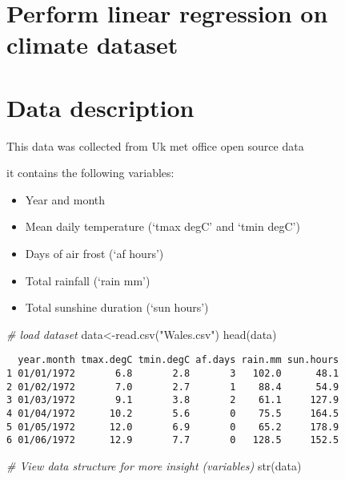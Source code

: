 \documentclass[
]{article}
\author{}
\date{\vspace{-2.5em}}
\newenvironment{Shaded}{\begin{snugshade}}{\end{snugshade}}
\newcommand{\CommentTok}[1]{\textcolor[rgb]{0.56,0.35,0.01}{\textit{#1}}}
\newcommand{\FunctionTok}[1]{\textcolor[rgb]{0.00,0.00,0.00}{#1}}
\newcommand{\NormalTok}[1]{#1}
\newcommand{\OtherTok}[1]{\textcolor[rgb]{0.56,0.35,0.01}{#1}}
\newcommand{\StringTok}[1]{\textcolor[rgb]{0.31,0.60,0.02}{#1}}
\begin{document}
\hypertarget{perform-linear-regression-on-climate-dataset}{%
\section{Perform linear regression on climate
dataset}\label{perform-linear-regression-on-climate-dataset}}

\hypertarget{data-description}{%
\section{Data description}\label{data-description}}

This data was collected from Uk met office open source data

it contains the following variables:

\begin{itemize}
\item
  Year and month
\item
  Mean daily temperature (`tmax degC' and `tmin degC')
\item
  Days of air frost (`af hours')
\item
  Total rainfall (`rain mm')
\item
  Total sunshine duration (`sun hours')
\end{itemize}

\begin{Shaded}
\begin{Highlighting}[]
\CommentTok{\# load dataset}
\NormalTok{data}\OtherTok{\textless{}{-}}\FunctionTok{read.csv}\NormalTok{(}\StringTok{"Wales.csv"}\NormalTok{)}
\FunctionTok{head}\NormalTok{(data)}
\end{Highlighting}
\end{Shaded}

\begin{verbatim}
  year.month tmax.degC tmin.degC af.days rain.mm sun.hours
1 01/01/1972       6.8       2.8       3   102.0      48.1
2 01/02/1972       7.0       2.7       1    88.4      54.9
3 01/03/1972       9.1       3.8       2    61.1     127.9
4 01/04/1972      10.2       5.6       0    75.5     164.5
5 01/05/1972      12.0       6.9       0    65.2     178.9
6 01/06/1972      12.9       7.7       0   128.5     152.5
\end{verbatim}

\begin{Shaded}
\begin{Highlighting}[]
\CommentTok{\# View data structure for more insight (variables)}
\FunctionTok{str}\NormalTok{(data)}
\end{Highlighting}
\end{Shaded}
\end{document}
